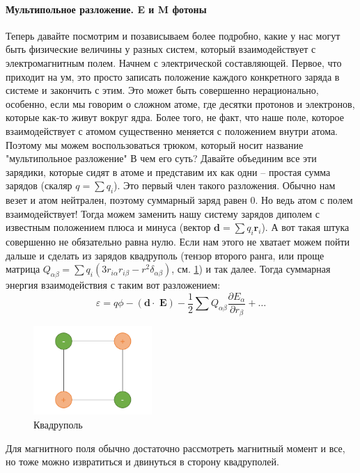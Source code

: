 \documentclass[12pt]{article}
\begin{document}
\paragraph{Мультипольное разложение. E и M фотоны}
Теперь давайте посмотрим и позависываем более подробно, какие у нас могут быть физические величины у разных систем, который взаимодействует с электромагнитным полем. Начнем с электрической составляющей. Первое, что приходит на ум, это просто записать положение каждого конкретного заряда в системе и закончить с этим. Это может быть совершенно нерационально, особенно, если мы говорим о сложном атоме, где десятки протонов и электронов, которые как-то живут вокруг ядра. Более того, не факт, что наше поле, которое взаимодействует с атомом существенно меняется с положением внутри атома. Поэтому мы можем воспользоваться трюком, который носит название "мультипольное разложение" В чем его суть? Давайте объединим все эти зарядики, которые сидят в атоме и представим их как одни -- простая сумма зарядов (скаляр $q = \sum q_i$). Это первый член такого разложения. Обычно нам везет и атом нейтрален, поэтому суммарный заряд равен 0. Но ведь атом с полем взаимодействует! Тогда можем заменить нашу систему зарядов диполем с известным положением плюса и минуса (вектор $\textbf{d} = \sum q_i \textbf{r}_i$). А вот такая штука совершенно не обязательно равна нулю. Если нам этого не хватает можем пойти дальше и сделать из зарядов квадруполь (тензор второго ранга, или проще матрица $Q_{\alpha\beta} = \sum q_i(3r_{i\alpha}r_{i\beta}-r^2\delta_{\alpha\beta}) $, см. \ref{fig:sem_08_quad}) и так далее. Тогда суммарная энергия взаимодействия с таким вот разложением:
\begin{equation*}
    \varepsilon = q\phi - (\textbf{d}\cdot\textbf{ E}) - \dfrac{1}{2}\sum Q_{\alpha\beta}\dfrac{\partial E_{\alpha}}{\partial r_{\beta}}+ \dots
\end{equation*}

\begin{figure}[h]
    \centering
    \includegraphics[width=0.4\textwidth,height=\textheight,keepaspectratio]{Seminar_08/pics/pic_02.pdf}
    \caption{Квадруполь}
    \label{fig:sem_08_quad}
\end{figure}
Для магнитного поля обычно достаточно рассмотреть магнитный момент и все, но тоже можно извратиться и двинуться в сторону квадруполей.
\end{document}
